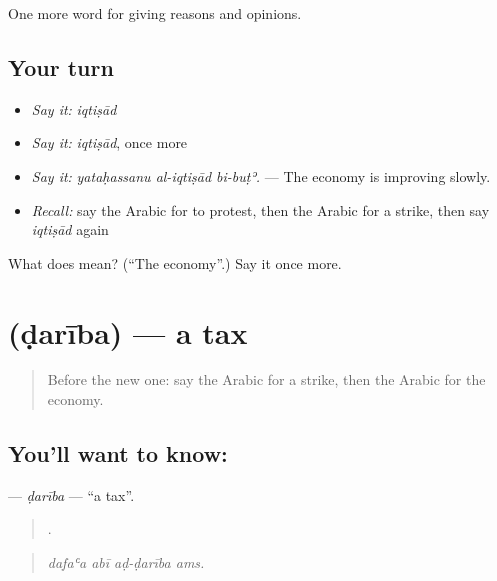 \begin{grammarlens}[title={What you've built}]
One more word for giving reasons and opinions.
\end{grammarlens}

\subsection*{Your turn}
\begin{itemize}
\raggedright
  \item \emph{Say it:} \emph{iqtiṣād}
  \item \emph{Say it:} \emph{iqtiṣād}, once more
  \item \emph{Say it:} \emph{yataḥassanu al-iqtiṣād bi-buṭʾ.} — The economy is improving slowly.
  \item \emph{Recall:} say the Arabic for to protest, then the Arabic for a strike, then say \emph{iqtiṣād} again
\end{itemize}

\begin{tcolorbox}[breakable,colback=teal!4,colframe=teal!35!black,title={Before you move on}]
What does  mean? (\textquotedblleft{}The economy\textquotedblright{}.) Say it once more.
\end{tcolorbox}
\section[\texorpdfstring{\ar{ضريبة} (ḍarība)}{ضريبة (ḍarība)}]{ (ḍarība) — a tax}

\label{lesson:AR-C383-dariba}



\begin{quote}
Before the new one: say the Arabic for a strike, then the Arabic for the economy.
\end{quote}

\subsection*{You'll want to know: }
\textbf{} — \emph{ḍarība} — \textquotedblleft{}a tax\textquotedblright{}.

\begin{quote}
   .
\end{quote}

\begin{quote}
\emph{dafaʿa abī aḍ-ḍarība ams.}
\end{quote}

